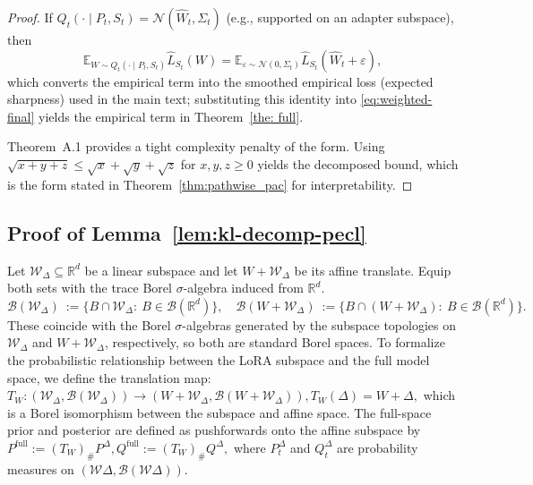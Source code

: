 \documentclass{article}
\theoremstyle{plain}
\theoremstyle{definition}
\theoremstyle{remark}
\begin{document}
\begin{proof}
If $Q_t(\cdot\mid P_t,S_t)=\mathcal N(\hat W_t,\Sigma_t)$ (e.g., supported on an adapter subspace), then
\[
\mathbb E_{W\sim Q_t(\cdot\mid P_t,S_t)}\hat L_{S_t}(W)
=\mathbb E_{\varepsilon\sim\mathcal N(0,\Sigma_t)}\hat L_{S_t}(\hat W_t+\varepsilon),
\]
which converts the empirical term into the smoothed empirical loss (expected sharpness) used in the main text; substituting this identity into \eqref{eq:weighted-final} yields the empirical term in Theorem~\ref{the: full}.

Theorem~A.1 provides a tight complexity penalty of the form.
Using $\sqrt{x+y+z}\le \sqrt{x}+\sqrt{y}+\sqrt{z}$ for $x,y,z\ge 0$ yields the decomposed bound, which is the form stated in Theorem~\ref{thm:pathwise_pac} for interpretability.

\end{proof}



\subsection{Proof of Lemma~\ref{lem:kl-decomp-pecl}}
\label{proof:Lemma1}

Let $\mathcal W_\Delta\subseteq\mathbb R^d$ be a linear subspace and let $W+\mathcal W_\Delta$ be its affine translate. 
Equip both sets with the trace Borel $\sigma$-algebra induced from $\mathbb R^d$. 
$\mathcal B(\mathcal W_\Delta)\ :=\{B\cap \mathcal W_\Delta:\ B\in \mathcal B(\mathbb R^d)\},\quad
\mathcal B(W+\mathcal W_\Delta)\ :=\{B\cap (W+\mathcal W_\Delta):\ B\in \mathcal B(\mathbb R^d)\}.$
These coincide with the Borel $\sigma$-algebras generated by the subspace topologies on $\mathcal W_\Delta$ and $W+\mathcal W_\Delta$, respectively, so both are standard Borel spaces.
To formalize the probabilistic relationship between the LoRA subspace and the full model space, we define the translation map:
$T_W: (\mathcal W_\Delta,\mathcal B(\mathcal W_\Delta)) \to (W+\mathcal W_\Delta,\mathcal B(W+\mathcal W_\Delta)), 
T_W(\Delta)=W+\Delta,$
which is a Borel isomorphism between the subspace and affine space.  The full-space prior and posterior are defined as pushforwards onto the affine subspace by
$
P^{\mathrm{full}}:=(T_W)_{\text{\#}} P^{\Delta},
Q^{\mathrm{full}}:=(T_W)_{\text{\#}} Q^{\Delta},
$
where $P_t^{\Delta}$ and $Q_t^{\Delta}$ are probability measures on $(\mathcal{W}\Delta, \mathcal{B}(\mathcal{W}\Delta))$.
\end{document}
